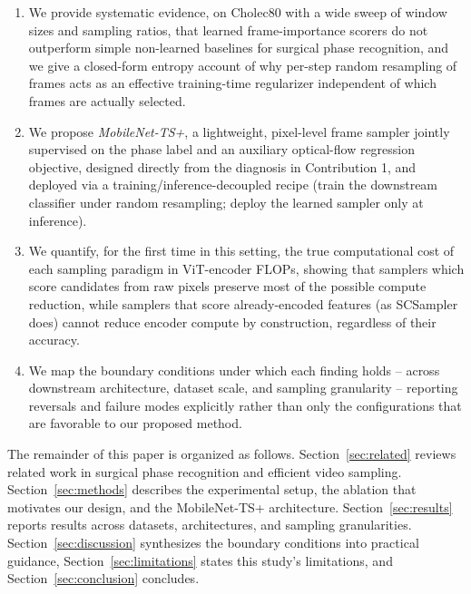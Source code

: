 \documentclass[preprint,12pt]{elsarticle}
\begin{document}
\begin{enumerate}
  \item We provide systematic evidence, on Cholec80 with a wide sweep of window sizes and sampling ratios, that learned frame-importance scorers do not outperform simple non-learned baselines for surgical phase recognition, and we give a closed-form entropy account of why per-step random resampling of frames acts as an effective training-time regularizer independent of which frames are actually selected.
  \item We propose \emph{MobileNet-TS+}, a lightweight, pixel-level frame sampler jointly supervised on the phase label and an auxiliary optical-flow regression objective, designed directly from the diagnosis in Contribution 1, and deployed via a training/inference-decoupled recipe (train the downstream classifier under random resampling; deploy the learned sampler only at inference).
  \item We quantify, for the first time in this setting, the true computational cost of each sampling paradigm in ViT-encoder FLOPs, showing that samplers which score candidates from raw pixels preserve most of the possible compute reduction, while samplers that score already-encoded features (as SCSampler does) cannot reduce encoder compute by construction, regardless of their accuracy.
  \item We map the boundary conditions under which each finding holds -- across downstream architecture, dataset scale, and sampling granularity -- reporting reversals and failure modes explicitly rather than only the configurations that are favorable to our proposed method.
\end{enumerate}

The remainder of this paper is organized as follows. Section~\ref{sec:related} reviews related work in surgical phase recognition and efficient video sampling. Section~\ref{sec:methods} describes the experimental setup, the ablation that motivates our design, and the MobileNet-TS+ architecture. Section~\ref{sec:results} reports results across datasets, architectures, and sampling granularities. Section~\ref{sec:discussion} synthesizes the boundary conditions into practical guidance, Section~\ref{sec:limitations} states this study's limitations, and Section~\ref{sec:conclusion} concludes.

\end{document}
